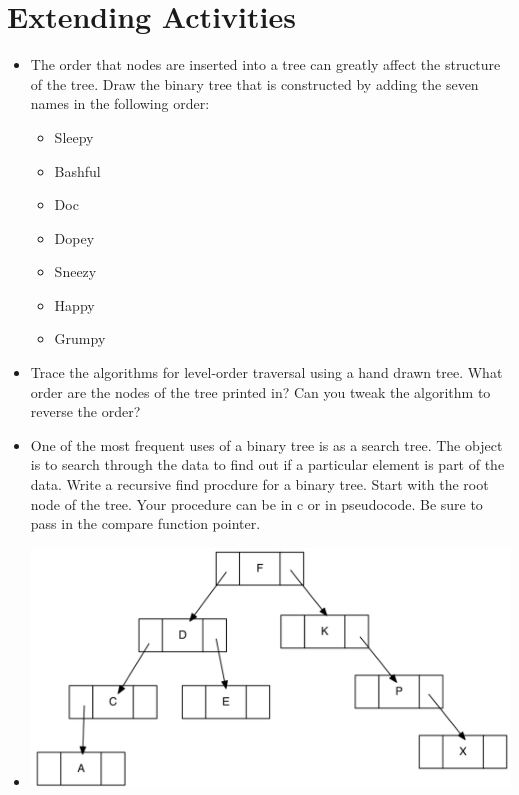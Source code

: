  

\section{Extending Activities}

\begin{itemize}


	\item {The order that nodes are inserted into a tree can greatly affect the
	structure of the tree. Draw the binary tree that is constructed by adding the
	seven names in the following order:
	
	\begin{itemize}
	\item
	  Sleepy
	\item
	  Bashful
	\item
	  Doc
	\item
	  Dopey
	\item
	  Sneezy
	\item
	  Happy
	\item
	  Grumpy
	\end{itemize}
	}



\item{ Trace the algorithms for level-order traversal using a hand
drawn tree.  What order are the nodes of the tree printed in?  Can you tweak the algorithm to reverse the order?
}
	
	
	
\item{ One of the most frequent uses of a binary tree is as a
search tree. The object is to search through the data to find out if a
particular element is part of the data. Write a recursive find procdure
for a binary tree. Start with the root node of the tree. Your procedure
can be in c or in pseudocode. Be sure to pass in the compare function
pointer.

}



	\item{
	\includegraphics[width=6.00000in]{pictures/image5.png}
	
}
\end{itemize}
